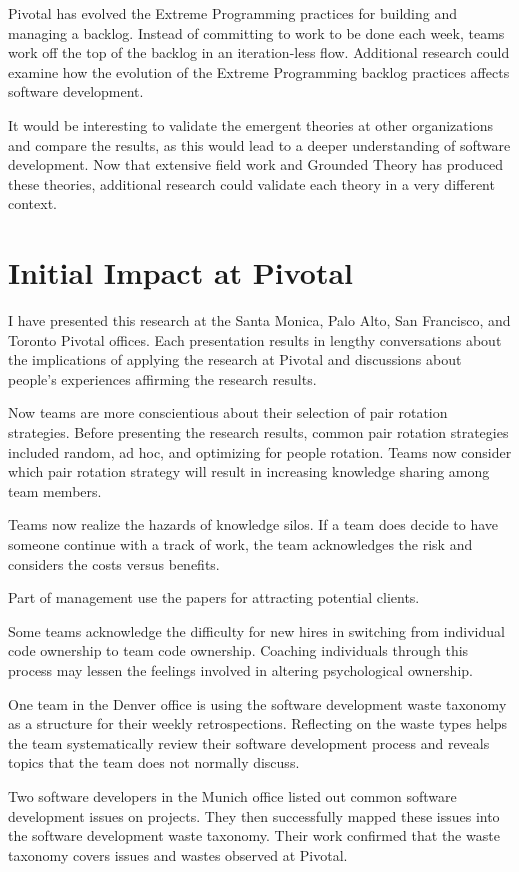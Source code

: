 Pivotal has evolved the Extreme Programming practices for building and managing a backlog. Instead of committing to work to be done each week, teams work off the top of the backlog in an iteration-less flow. Additional research could examine how the evolution of the Extreme Programming backlog practices affects software development.

It would be interesting to validate the emergent theories at other organizations and compare the results, as this would lead to a deeper understanding of software development. Now that extensive field work and Grounded Theory has produced these theories, additional research could validate each theory in a very different context.

\section{Initial Impact at Pivotal}
I have presented this research at the Santa Monica, Palo Alto, San Francisco, and Toronto Pivotal offices. Each presentation results in lengthy conversations about the implications of applying the research at Pivotal and discussions about people's experiences affirming the research results. 

Now teams are more conscientious about their selection of pair rotation strategies. Before presenting the research results, common pair rotation strategies included random, ad hoc, and optimizing for people rotation. Teams now consider which pair rotation strategy will result in increasing knowledge sharing among team members.

Teams now realize the hazards of knowledge silos. If a team does decide to have someone continue with a track of work, the team acknowledges the risk and considers the costs versus benefits.

Part of management use the papers for attracting potential clients.

Some teams acknowledge the difficulty for new hires in switching from individual code ownership to team code ownership. Coaching individuals through this process may lessen the feelings involved in altering psychological ownership. 

One team in the Denver office is using the software development waste taxonomy as a structure for their weekly retrospections.  Reflecting on the waste types helps the team systematically review their software development process and reveals topics that the team does not normally discuss.

Two software developers in the Munich office listed out common software development issues on projects. They then successfully mapped these issues into the software development waste taxonomy. Their work confirmed that the waste taxonomy covers issues and wastes observed at Pivotal.

